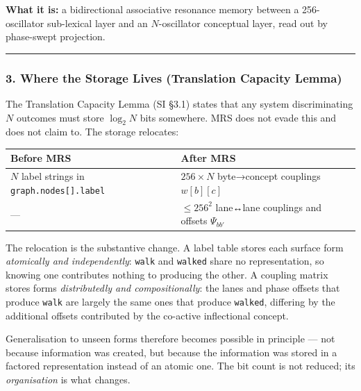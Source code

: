 \documentclass[
  11pt,
  a4paper,
]{article}
\begin{document}
\textbf{What it is:} a bidirectional associative resonance memory
between a 256-oscillator sub-lexical layer and an \(N\)-oscillator
conceptual layer, read out by phase-swept projection.

\begin{center}\rule{0.5\linewidth}{0.5pt}\end{center}

\subsubsection{3. Where the Storage Lives (Translation Capacity
Lemma)}\label{where-the-storage-lives-translation-capacity-lemma}

The Translation Capacity Lemma (SI §3.1) states that any system
discriminating \(N\) outcomes must store \(\log_2 N\) bits somewhere.
MRS does not evade this and does not claim to. The storage relocates:

\begin{longtable}[]{@{}
  >{\raggedright\arraybackslash}p{}
  >{\raggedright\arraybackslash}p{}@{}}
\toprule\noalign{}
\begin{minipage}[b]{\linewidth}\raggedright
Before MRS
\end{minipage} & \begin{minipage}[b]{\linewidth}\raggedright
After MRS
\end{minipage} \\
\midrule\noalign{}
\endhead
\bottomrule\noalign{}
\endlastfoot
\(N\) label strings in \texttt{graph.nodes{[}{]}.label} &
\(256 \times N\) byte→concept couplings \(w[b][c]\) \\
--- & \(\le 256^2\) lane↔lane couplings and offsets \(\Psi_{bb'}\) \\
\end{longtable}

The relocation is the substantive change. A label table stores each
surface form \emph{atomically and independently}: \texttt{walk} and
\texttt{walked} share no representation, so knowing one contributes
nothing to producing the other. A coupling matrix stores forms
\emph{distributedly and compositionally}: the lanes and phase offsets
that produce \texttt{walk} are largely the same ones that produce
\texttt{walked}, differing by the additional offsets contributed by the
co-active inflectional concept.

Generalisation to unseen forms therefore becomes possible in principle
--- not because information was created, but because the information was
stored in a factored representation instead of an atomic one. The bit
count is not reduced; its \emph{organisation} is what changes.
\end{document}
